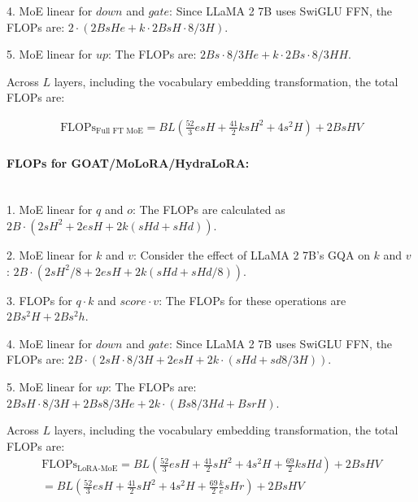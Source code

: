 4. MoE linear for \(down\) and \(gate\):  
   Since LLaMA 2 7B uses SwiGLU FFN, the FLOPs are:  
   \(2 \cdot (2BsHe + k \cdot 2BsH \cdot 8/3H)\).

5. MoE linear for \(up\):  
   The FLOPs are:  
   \(2Bs \cdot 8/3He + k \cdot 2Bs \cdot 8/3HH\).

Across \(L\) layers, including the vocabulary embedding transformation, the total FLOPs are:

\begin{align}
    \text{FLOPs}_{\text{Full FT MoE}} =  BL \left( \frac{52}{3}esH + \frac{41}{2}ksH^2 + 4s^2H \right)  + 2BsHV
\end{align}


\paragraph{FLOPs for GOAT/MoLoRA/HydraLoRA:\\ \\} 

1. MoE linear for \(q\) and \(o\):  
   The FLOPs are calculated as \(2B \cdot(2sH^2+ 2esH+ 2k(sHd + sHd))\).

2. MoE linear for \(k\) and \(v\): 
   Consider the effect of LLaMA 2 7B's GQA on \(k\) and \(v\) :  
   \( 2B \cdot (2sH^2/8 + 2esH+ 2k(sHd + sHd/8))\).

3. FLOPs for \(q \cdot k\) and \(score \cdot v\):  
   The FLOPs for these operations are \(2Bs^2H + 2Bs^2h\).

4. MoE linear for \(down\) and \(gate\):  
   Since LLaMA 2 7B uses SwiGLU FFN, the FLOPs are:  
   \(2B \cdot( 2sH · 8/3H + 2esH+2k\cdot(sHd+sd8/3H))\).

5. MoE linear for \(up\):  
   The FLOPs are:  
   \(2BsH · 8/3H + 2Bs8/3He+2k\cdot(Bs8/3Hd+BsrH)\).

Across \(L\) layers, including the vocabulary embedding transformation, the total FLOPs are:
\begin{align}
\text{FLOPs}_{\text{LoRA-MoE}} =   BL \left( \frac{52}{3}esH+ \frac{41}{2} sH^2 +4s^2H + \frac{69}{2}ksHd\right) + 2BsHV \\
=  BL \left( \frac{52}{3}esH+ \frac{41}{2} sH^2 +4s^2H + \frac{69}{2}\frac{k}{e}sHr\right) + 2BsHV
\end{align}